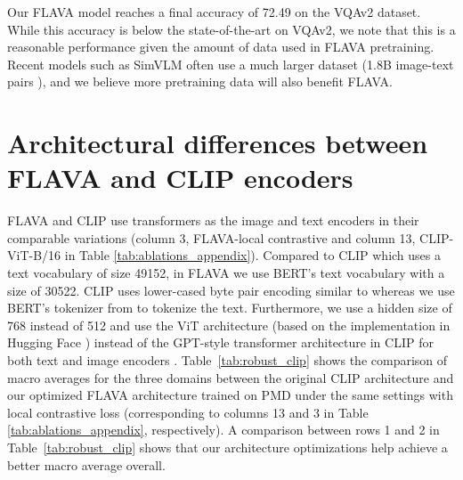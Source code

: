 \documentclass[10pt,twocolumn,letterpaper]{article}
\begin{document}
Our FLAVA model reaches a final accuracy of 72.49 on the VQAv2 dataset. While this accuracy is below the state-of-the-art on VQAv2, we note that this is a reasonable performance given the amount of data used in FLAVA pretraining. Recent models such as SimVLM \cite{wang2021simvlm} often use a much larger dataset (\eg 1.8B image-text pairs \cite{wang2021simvlm}), and we believe more pretraining data will also benefit FLAVA.

\section{Architectural differences between FLAVA and CLIP encoders}

\begin{table}[ht!]
\vspace{-0.5em}
\caption{Comparing our FLAVA image and text encoders to the original CLIP when trained under same settings on PMD.}
\label{tab:robust_clip}
\vspace{-0.5em}
\end{table}

FLAVA and CLIP \cite{radford2021learning} use transformers \cite{vaswani2017attention} as the image and text encoders in their comparable variations (column 3, FLAVA-local contrastive and column 13, CLIP-ViT-B/16 in Table \ref{tab:ablations_appendix}). Compared to CLIP which uses a text vocabulary of size 49152, in FLAVA we use BERT's text vocabulary with a size of 30522. CLIP uses lower-cased byte pair encoding similar to \cite{sennrich2015neural,radford2018improving} whereas we use BERT's tokenizer from \cite{wolf2020huggingfaces} to tokenize the text. Furthermore, we use a hidden size of 768 instead of 512 and use the ViT architecture (based on the implementation in Hugging Face \cite{wolf2020huggingfaces}) instead of the GPT-style transformer architecture in CLIP for both text and image encoders \cite{xiong2020layer}. Table~\ref{tab:robust_clip} shows the comparison of macro averages for the three domains between the original CLIP architecture and our optimized FLAVA architecture trained on PMD under the same settings with local contrastive loss (corresponding to columns 13 and 3 in Table \ref{tab:ablations_appendix}, respectively). A comparison between rows 1 and 2 in Table~\ref{tab:robust_clip} shows that our architecture optimizations help achieve a better macro average overall.
\end{document}
